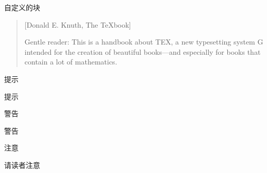 \documentclass[
  ignorenonframetext,
  UTF8,fontset=adobe,zihao=false]{ctexbeamer}
\begin{document}
\begin{frame}{自定义的块}
\protect\hypertarget{sec:custom-blocks}{}

\begin{quotation}[Donald E. Knuth, The \TeX book]

Gentle reader: This is a handbook about TEX, a new typesetting
system G intended for the creation of beautiful books---and
especially for books that contain a lot of mathematics.

\end{quotation}

\begin{exampleblock}{提示}

提示

\end{exampleblock}

\pause

\begin{alertblock}{警告}

警告

\end{alertblock}

\pause

\begin{block}{注意}

请读者注意

\end{block}

\end{frame}
\end{document}
